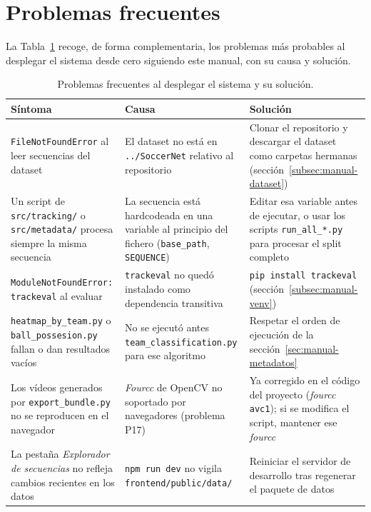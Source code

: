 \section{Problemas frecuentes}
\label{sec:manual-problemas}

La Tabla~\ref{tab:manual-problemas} recoge, de forma complementaria, los
problemas más probables al desplegar el sistema desde cero siguiendo este
manual, con su causa y solución.

\begin{table}[htp]
\centering
\caption{Problemas frecuentes al desplegar el sistema y su solución.}
\label{tab:manual-problemas}
\renewcommand{\arraystretch}{1.2}
\footnotesize
\begin{tabular}{|p{4.6cm}|p{4.0cm}|p{4.5cm}|}
\hline
\rowcolor{gray!25}
\textbf{Síntoma} & \textbf{Causa} & \textbf{Solución} \\
\hline
\texttt{FileNotFoundError} al leer secuencias del dataset &
  El dataset no está en \texttt{../SoccerNet} relativo al repositorio &
  Clonar el repositorio y descargar el dataset como carpetas hermanas
  (sección~\ref{subsec:manual-dataset}) \\
\hline
Un script de \texttt{src/tracking/} o \texttt{src/metadata/} procesa
  siempre la misma secuencia & La secuencia está hardcodeada en una
  variable al principio del fichero (\texttt{base\_path},
  \texttt{SEQUENCE}) & Editar esa variable antes de ejecutar, o usar los
  scripts \texttt{run\_all\_*.py} para procesar el split completo \\
\hline
\texttt{ModuleNotFoundError: trackeval} al evaluar &
  \texttt{trackeval} no quedó instalado como dependencia transitiva &
  \texttt{pip install trackeval} (sección~\ref{subsec:manual-venv}) \\
\hline
\texttt{heatmap\_by\_team.py} o \texttt{ball\_possesion.py} fallan o dan
  resultados vacíos & No se ejecutó antes \texttt{team\_classification.py}
  para ese algoritmo & Respetar el orden de ejecución de la
  sección~\ref{sec:manual-metadatos} \\
\hline
Los vídeos generados por \texttt{export\_bundle.py} no se reproducen en el
  navegador & \emph{Fourcc} de OpenCV no soportado por navegadores
  (problema P17) & Ya corregido en el código del proyecto
  (\emph{fourcc} \texttt{avc1}); si se modifica el script, mantener ese
  \emph{fourcc} \\
\hline
La pestaña \emph{Explorador de secuencias} no refleja cambios recientes en
  los datos & \texttt{npm run dev} no vigila
  \texttt{frontend/public/data/} & Reiniciar el servidor de desarrollo
  tras regenerar el paquete de datos \\
\hline
\end{tabular}
\end{table}
